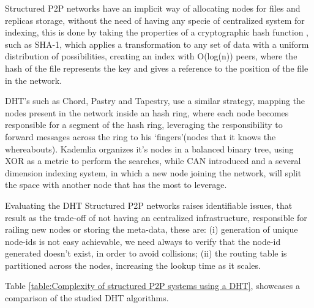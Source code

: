 Structured P2P networks have an implicit way of allocating nodes for files and replicas storage, without the need of having any specie of centralized system for indexing, this is done by taking the properties of a cryptographic hash function \cite{Bakhtiari}\cite{Kargerl}\cite{Preneel1999}, such as SHA-1\cite{D.Eastlake3rdMotorola;P.JonesSystems2001}, which applies a transformation to any set of data with a uniform distribution of possibilities, creating an index with O(log(n)) peers, where the hash of the file represents the key and gives a reference to the position of the file in the network.

DHT's such as Chord\cite{Stoica2001}, Pastry\cite{Rowstron2001} and Tapestry\cite{Zhao2001}, use a similar strategy, mapping the nodes present in the network inside an hash ring, where each node becomes responsible for a segment of the hash ring, leveraging the responsibility to forward messages across the ring to his `fingers'(nodes that it knows the whereabouts). Kademlia\cite{Maymounkov} organizes it's nodes in a balanced binary tree, using XOR as a metric to perform the searches, while CAN\cite{Handley} introduced and a several dimension indexing system, in which a new node joining the network, will split the space with another node that has the most to leverage.

Evaluating the DHT Structured P2P networks raises identifiable issues, that result as the trade-off of not having an centralized infrastructure, responsible for railing new nodes or storing the meta-data, these are: (i) generation of unique node-ids is not easy achievable, we need always to verify that the node-id generated doesn't exist, in order to avoid collisions; (ii) the routing table is partitioned across the nodes, increasing the lookup time as it scales.

Table \ref{table:Complexity of structured P2P systems using a DHT}, showcases a comparison of the studied DHT algorithms.

